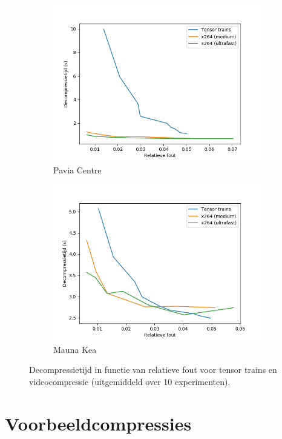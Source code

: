 \begin{figure}[H]
\begin{subfigure}{0.48\textwidth}
  \includegraphics[width=\linewidth]{images/general_comparison_decompression_times_Pavia_Centre.png}
  \caption{Pavia Centre}
\end{subfigure}
\begin{subfigure}{0.48\textwidth}
  \centering
  \includegraphics[width=\linewidth]{images/general_comparison_decompression_times_Mauna_Kea.png}
  \caption{Mauna Kea}
\end{subfigure}
\caption{Decompressietijd in functie van relatieve fout voor tensor trains en videocompressie (uitgemiddeld over 10 experimenten).}
\label{fig:general-comparison-decompression-times}
\end{figure}

\section{Voorbeeldcompressies}

